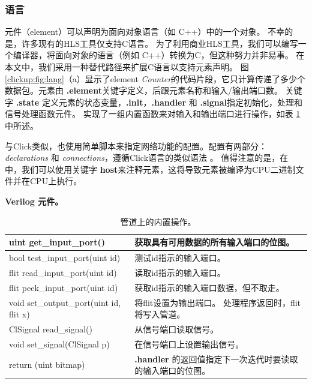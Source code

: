 \subsubsection{语言}

\name 元件（element）可以声明为面向对象语言（如 C++）中的一个对象。
不幸的是，许多现有的HLS工具仅支持C语言。
为了利用商业HLS工具，我们可以编写一个编译器，将面向对象的语言（例如 C++）转换为C，但这种努力并非易事。
在本文中，我们采用一种替代路径来扩展C语言以支持元素声明。
图 \ref {clicknp:fig:lang}（a）显示了element \textit {Counter}的代码片段，它只计算传递了多少个数据包。元素由 \textbf {.element}关键字定义，后跟元素名称和输入/输出端口数。
关键字 \textbf {.state} 定义元素的状态变量，\textbf {.init}，\textbf {.handler} 和 \textbf {.signal}指定初始化，处理和信号处理函数元件。
实现了一组内置函数来对输入和输出端口进行操作，如表 \ref {clicknp:tab:built-in} 中所述。

与Click类似，\name 也使用简单脚本来指定网络功能的配置。配置有两部分：\textit {declarations} 和 \textit {connections}，遵循Click语言的类似语法 \cite {kohler2000click}。
值得注意的是，在 \name 中，我们可以使用关键字 \textbf {host}来注释元素，这将导致元素被编译为CPU二进制文件并在CPU上执行。

\textbf{Verilog 元件。}

\begin{table}

\centering
\caption{\name\ 管道上的内置操作。}
\label{clicknp:tab:built-in}
\begin{tabular}{p{}|p{}}
\toprule
uint get\_input\_port() & 获取具有可用数据的所有输入端口的位图。 \\
\midrule
bool test\_input\_port(uint id) & 测试id指示的输入端口。 \\
\midrule
flit read\_input\_port(uint id) & 读取id指示的输入端口。 \\
\midrule
flit peek\_input\_port(uint id) & 获取id指示的输入端口数据，但不取走。 \\
\midrule
void set\_output\_port(uint id, flit x) & 将flit设置为输出端口。 处理程序返回时，flit将写入管道。\\
\midrule
ClSignal read\_signal() & 从信号端口读取信号。\\
\midrule
void set\_signal(ClSignal p) & 在信号端口上设置输出信号。\\
\midrule
return (uint bitmap) & \textbf{.handler} 的返回值指定下一次迭代时要读取的输入端口的位图。 \\
\bottomrule
\end{tabular}

\end{table}

